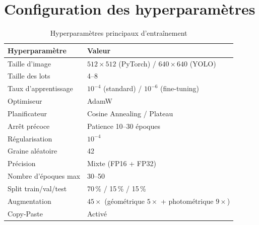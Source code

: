 \documentclass[12pt,a4paper]{report}
\begin{document}
\appendix

\chapter{Configuration des hyperparam\`etres}
\begin{table}[H]
\centering
\begin{tabular}{ll}
\toprule
\textbf{Hyperparam\`etre} & \textbf{Valeur} \\
\midrule
Taille d'image          & $512 \times 512$ (PyTorch) / $640 \times 640$ (YOLO) \\
Taille des lots         & 4--8 \\
Taux d'apprentissage    & $10^{-4}$ (standard) / $10^{-6}$ (fine-tuning) \\
Optimiseur              & AdamW~\cite{loshchilov2019adamw} \\
Planificateur           & Cosine Annealing / Plateau \\
Arr\^et pr\'ecoce          & Patience 10--30 \'epoques \\
R\'egularisation          & $10^{-4}$ \\
Graine al\'eatoire        & 42 \\
Pr\'ecision               & Mixte (FP16 + FP32) \\
Nombre d'\'epoques max    & 30--50 \\
Split train/val/test    & 70\,\% / 15\,\% / 15\,\% \\
Augmentation            & $45\times$ (g\'eom\'etrique $5\times$ + photom\'etrique $9\times$) \\
Copy-Paste              & Activ\'e~\cite{ghiasi2021copypaste} \\
\bottomrule
\end{tabular}
\caption{Hyperparam\`etres principaux d'entra\^inement}
\end{table}


\end{document}
